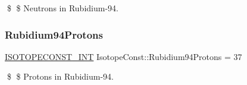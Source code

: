 \$ \$ Neutrons in Rubidium-\/94. \mbox{\label{group___isotope_const-_rubidium-_rb94_ga416802a4623546079af7021aeabbf1d1}} 
\subsubsection{\texorpdfstring{Rubidium94\+Protons}{Rubidium94Protons}}
{\footnotesize\ttfamily \mbox{\hyperlink{group___isotope_const-_macros_ga5f18360b3e99483a35c32d789e62621c}{I\+S\+O\+T\+O\+P\+E\+C\+O\+N\+S\+T\+\_\+\+I\+NT}} Isotope\+Const\+::\+Rubidium94\+Protons = 37}

\$ \$ Protons in Rubidium-\/94. 